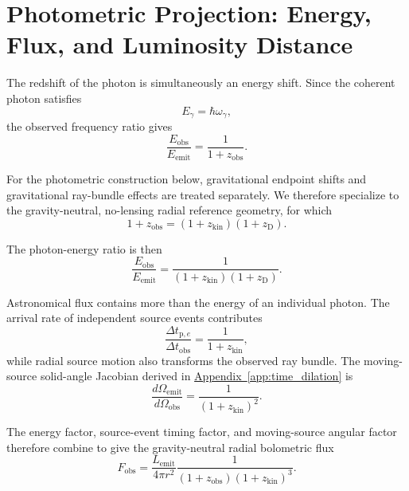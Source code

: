 \section{Photometric Projection: Energy, Flux, and Luminosity Distance}
\label{sec:photonic_relaxation}

The redshift of the photon is simultaneously an energy shift. Since the coherent photon satisfies
\begin{equation}
    E_\gamma
    =
    \hbar\omega_\gamma,
\end{equation}
the observed frequency ratio gives
\begin{equation}
    \frac{E_{\mathrm{obs}}}{E_{\mathrm{emit}}}
    =
    \frac{1}{1+z_{\mathrm{obs}}}.
\end{equation}

For the photometric construction below, gravitational endpoint shifts and gravitational ray-bundle effects are treated separately. We therefore specialize to the gravity-neutral, no-lensing radial reference geometry, for which
\begin{equation}
    1+z_{\mathrm{obs}}
    =
    (1+z_{\mathrm{kin}})
    (1+z_{\mathrm D}).
\end{equation}

The photon-energy ratio is then
\begin{equation}
    \frac{E_{\mathrm{obs}}}{E_{\mathrm{emit}}}
    =
    \frac{1}{
        (1+z_{\mathrm{kin}})
        (1+z_{\mathrm D})
    }.
\end{equation}

Astronomical flux contains more than the energy of an individual photon. The arrival rate of independent source events contributes
\begin{equation}
    \frac{\Delta t_{\mathrm p,e}}{\Delta t_{\mathrm{obs}}}
    =
    \frac{1}{1+z_{\mathrm{kin}}},
\end{equation}
while radial source motion also transforms the observed ray bundle. The moving-source solid-angle Jacobian derived in
\hyperref[app:time_dilation]{Appendix~\ref*{app:time_dilation}}
is
\begin{equation}
    \frac{d\Omega_{\mathrm{emit}}}{d\Omega_{\mathrm{obs}}}
    =
    \frac{1}{(1+z_{\mathrm{kin}})^2}.
\end{equation}

The energy factor, source-event timing factor, and moving-source angular factor therefore combine to give the gravity-neutral radial bolometric flux
\begin{equation}
    F_{\mathrm{obs}}
    =
    \frac{L_{\mathrm{emit}}}{4\pi r^2}
    \frac{1}{
        (1+z_{\mathrm{obs}})
        (1+z_{\mathrm{kin}})^3
    }.
\end{equation}

